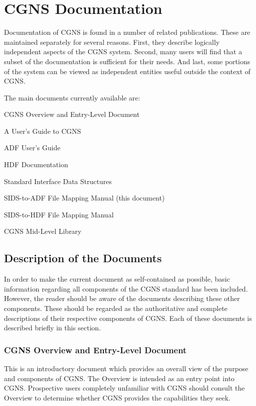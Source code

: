\section{CGNS Documentation}
\label{s:documentation}
\thispagestyle{plain}

Documentation of CGNS is found in a number of related
publications. These are maintained separately for several
reasons. First, they describe logically independent aspects of the CGNS
system. Second, many users will find that a subset of the documentation
is sufficient for their needs. And last, some portions of the system can
be viewed as independent entities useful outside the context of CGNS.

The main documents currently available are:

\begin{itemize*}
\item CGNS Overview and Entry-Level Document
\item A User's Guide to CGNS
\item ADF User's Guide
\item HDF Documentation
\item Standard Interface Data Structures
\item SIDS-to-ADF File Mapping Manual (this document)
\item SIDS-to-HDF File Mapping Manual
\item CGNS Mid-Level Library
\end{itemize*}

\subsection{Description of the Documents}

In order to make the current document as self-contained as possible,
basic information regarding all components of the CGNS standard has
been included. However, the reader should be aware of the documents
describing these other components. These should be regarded as the
authoritative and complete descriptions of their respective components
of CGNS. Each of these documents is described briefly in this section.

\subsubsection{CGNS Overview and Entry-Level Document}

This is an introductory document which provides an overall view of the
purpose and components of CGNS. The Overview is intended as an entry
point into CGNS. Prospective users completely unfamiliar with CGNS
should consult the Overview to determine whether CGNS provides the
capabilities they seek.

